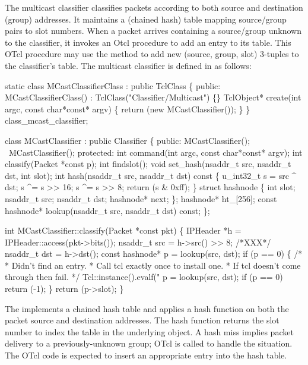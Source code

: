 The multicast classifier classifies packets
according to both source and destination (group) addresses.
It maintains a (chained hash) table mapping source/group pairs to slot numbers.
When a packet arrives containing a source/group unknown to the classifier,
it invokes an Otcl procedure 
to add an entry to its table.
This OTcl procedure may use the method  to add
new (source, group, slot) 3-tuples to the classifier's table.
The multicast classifier is defined in 
as follows:
\begin{program}
        static class MCastClassifierClass : public TclClass \{
        public:
                MCastClassifierClass() : TclClass("Classifier/Multicast") \{\}
                TclObject* create(int argc, const char*const* argv) \{
                        return (new MCastClassifier());
                \}
        \} class_mcast_classifier;

        class MCastClassifier : public Classifier \{
        public:
                MCastClassifier();
                ~MCastClassifier();
        protected:
                int command(int argc, const char*const* argv);
                int classify(Packet *const p);
                int findslot();
                void set_hash(nsaddr_t src, nsaddr_t dst, int slot);
                int hash(nsaddr_t src, nsaddr_t dst) const \{
                        u_int32_t s = src ^ dst;
                        s ^= s >> 16;
                        s ^= s >> 8;
                        return (s & 0xff);
                \}
                struct hashnode \{
                        int slot;
                        nsaddr_t src;
                        nsaddr_t dst;
                        hashnode* next;
                \};
                hashnode* ht_[256];
                const hashnode* lookup(nsaddr_t src, nsaddr_t dst) const;
        \};

        int MCastClassifier::classify(Packet *const pkt)
        \{
                IPHeader *h = IPHeader::access(pkt->bits());
                nsaddr_t src = h->src() >> 8; /*XXX*/
                nsaddr_t dst = h->dst();
                const hashnode* p = lookup(src, dst);
                if (p == 0) \{
                        /*
                         * Didn't find an entry.
                         * Call tcl exactly once to install one.
                         * If tcl doesn't come through then fail.
                         */
                        Tcl::instance().evalf("%
                        p = lookup(src, dst);
                        if (p == 0)
                                return (-1);
                \}
                return (p->slot);
        \}
\end{program}
The   implements a chained hash table
and applies a hash function on both the packet source and
destination addresses.
The hash function returns the slot number
to index the  table in the underlying object.
A hash miss implies packet delivery to a previously-unknown group;
OTcl is called to handle the situation.
The OTcl code is expected to insert an appropriate entry into the hash table.

